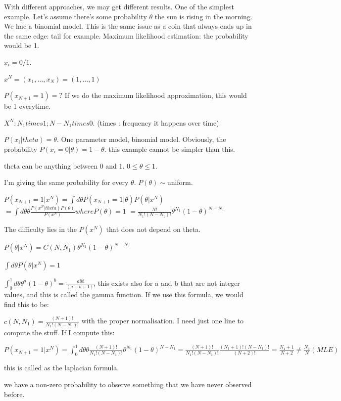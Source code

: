 \documentclass[a4paper]{tufte-book}
\begin{document}
With different approaches, we may get different results. One of the simplest
example.
Let's assume there's some probability $\theta$ the sun is rising in the morning.
We hae a binomial model. This is the same issue as a coin that always ends up
in the same edge: tail for example.
Maximum likelihood estimation: the probability would be 1.

$x_i = 0/1.$

$x^N = (x_1, \ldots ,x_N) = (1,\ldots,1)$

$P(x_{N+1} = 1) = ?$
If we do the maximum likelihood approximation, this would be 1 everytime.

$X^N : N_1 times 1 ; N-N_1 times 0.$ (times : frequency it happens over time)

$P(x_i|theta) = \theta$. One parameter model, binomial model.
Obviously, the probability $P(x_i=0|\theta) = 1 - \theta$. this example cannot be
simpler than this.


theta can be anything between 0 and 1. $0 \leq \theta \leq 1$.

I'm giving the same probability for every $\theta$. $P(\theta) \sim $uniform.

$P(x_{N+1} =1|x^N) = \int d\theta P(x_{N+1}=1|\theta) P(\theta|x^N)$
$= \int d\theta \theta \frac{P(x^N|theta)P(\theta)}{P(x^N)} where P(\theta) = 1$
$= \frac{N!}{N_1!(N-N_1)!} \theta^{N_1} (1-\theta)^{N-N_1}$

The difficulty lies in the $P(x^N)$ that does not depend on theta.

$P(\theta|x^N)=C(N,N_1) \theta^{N_1} (1-\theta)^{N-N_1}$

$\int d\theta P(\theta|x^N) = 1$

$\int_0^1 d\theta \theta^a (1-\theta)^b = \frac{a!b!}{(a+b+1)!}$
this exists also for a and b that are not integer values, and this is called the
gamma function.
If we use this formula, we would find this to be:

$c(N,N_1) = \frac{(N+1)!}{N_1!(N-N_1)!}$
with the proper normalisation.
I need just one line to compute the stuff.
If I compute this:

$P(x_{N+1}=1|x^N) = \int_0^1 d\theta \theta \frac{(N+1)!}{N_1!(N-N_1)!} \theta^{N_1} (1 - \theta)^{N-N_1}
= \frac{(N+1)!}{N_1!(N-N_1)!} \frac{(N_1 + 1)! (N-N_1)!}{(N+2)!}
= \frac{N_1 + 1}{N+2} \neq \frac{N_1}{N} (MLE)$

this is called as the laplacian formula.

we have a non-zero probability to observe something that we have never observed
before.
\end{document}
